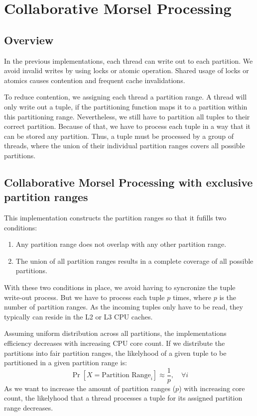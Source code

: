 \section{Collaborative Morsel Processing}\label{section-Collaborative-Morsel-Processing}
\subsection{Overview}
In the previous implementations, each thread can write out to each partition.
We avoid invalid writes by using locks or atomic operation.
Shared usage of locks or atomics causes contention and frequent cache invalidations.

To reduce contention, we assigning each thread a partition range.
A thread will only write out a tuple, if the partitioning function maps it to a partition within this partitioning range.
Nevertheless, we still have to partition all tuples to their correct partition.
Because of that, we have to process each tuple in a way that it can be stored any partition.
Thus, a tuple must be processed by a group of threads, where the union of their individual partition ranges covers all possible partitions.
\subsection{Collaborative Morsel Processing with exclusive partition ranges}
This implementation constructs the partition ranges so that it fufills two conditions:
\begin{enumerate}
  \item Any partition range does not overlap with any other partition range.
  \item The union of all partition ranges results in a complete coverage of all possible partitions.
\end{enumerate}
With these two conditions in place, we avoid having to syncronize the tuple write-out process.
But we have to process each tuple $p$ times, where $p$ is the number of partition ranges.
As the incoming tuples only have to be read, they typically can reside in the L2 or L3 \ac{CPU} caches.

Assuming uniform distribution across all partitions, the implementations efficiency decreases with increasing CPU core count.
If we distribute the partitions into fair partition ranges, the likelyhood of a given tuple to be partitioned in a given partition range is:
\begin{equation}\label{equation-CMP-exclusive-partition-ranges}
  \Pr[X=\textrm{Partition Range}_i] \approx \frac{1}{p},  \quad \forall i
\end{equation}
As we want to increase the amount of partition ranges ($p$) with increasing core count, the likelyhood that a thread processes a tuple for its assigned partition range decreases.
